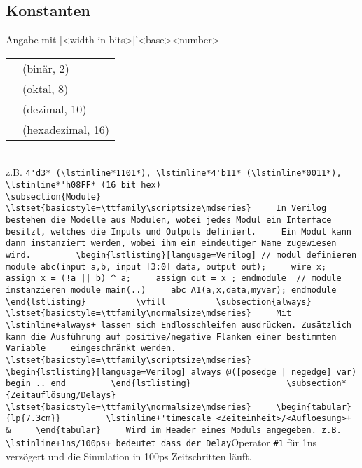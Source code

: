 \begin{multicols}{2}
	
	\subsection{Konstanten}
		Angabe mit [\textless width in bits\textgreater]'\textless base\textgreater\textless number\textgreater \\
		\begin{tabular}{ll}
		\lstinline*'b* &(binär, 2) \\
		\lstinline*'o* &(oktal, 8) \\
		\lstinline*'d* &(dezimal, 10) \\
		\lstinline*'h* &(hexadezimal, 16)
		\end{tabular} \\
		z.B. \lstinline*-4'd3* (\lstinline*1101*), \lstinline*4'b11* (\lstinline*0011*), \lstinline*'h08FF* (16 bit hex)
		
	
	
	\subsection{Module}
	\lstset{basicstyle=\ttfamily\scriptsize\mdseries}
	In Verilog bestehen die Modelle aus Modulen, wobei jedes Modul ein Interface besitzt, welches die Inputs und Outputs definiert.
	Ein Modul kann dann instanziert werden, wobei ihm ein eindeutiger Name zugewiesen wird.
		\begin{lstlisting}[language=Verilog]
// modul definieren
module abc(input a,b, input [3:0] data, output out);
	wire x;
	assign x = (!a || b) ^ a;
	assign out = x ;
endmodule

// module instanzieren
module main(..)
	abc A1(a,x,data,myvar);
endmodule
		\end{lstlisting}
	
	\vfill
	
	\subsection{always}
	\lstset{basicstyle=\ttfamily\normalsize\mdseries}
	Mit \lstinline+always+ lassen sich Endlosschleifen ausdrücken. Zusätzlich
	kann die Ausführung auf positive/negative Flanken einer bestimmten Variable
	eingeschränkt werden.
	\lstset{basicstyle=\ttfamily\scriptsize\mdseries}
		\begin{lstlisting}[language=Verilog]
always @([posedge | negedge] var) begin .. end
		\end{lstlisting}
	
		
	\subsection*{Zeitauflösung/Delays}
	\lstset{basicstyle=\ttfamily\normalsize\mdseries}
	\begin{tabular}{lp{7.3cm}}
		\lstinline+'timescale <Zeiteinheit>/<Aufloesung>+ &
	\end{tabular}
	Wird im Header eines Moduls angegeben. z.B. \lstinline+1ns/100ps+ bedeutet dass der Delay-Operator \lstinline+#1+ für 1ns verzögert und die Simulation in 100ps Zeitschritten läuft. 
			

\end{multicols}
